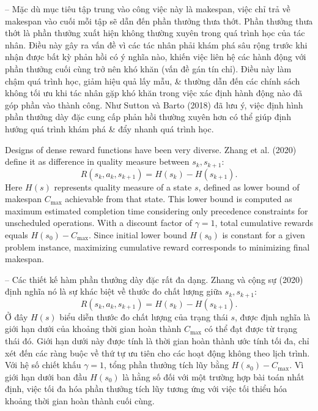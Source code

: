 \documentclass{article}
\begin{document}
\begin{itemize}
\begin{itemize}
        -- Mặc dù mục tiêu tập trung vào công việc này là makespan, việc chỉ trả về makespan vào cuối mỗi tập sẽ dẫn đến phần thưởng thưa thớt. Phần thưởng thưa thớt là phần thưởng xuất hiện không thường xuyên trong quá trình học của tác nhân. Điều này gây ra vấn đề vì các tác nhân phải khám phá sâu rộng trước khi nhận được bất kỳ phản hồi có ý nghĩa nào, khiến việc liên hệ các hành động với phần thưởng cuối cùng trở nên khó khăn (vấn đề gán tín chỉ). Điều này làm chậm quá trình học, giảm hiệu quả lấy mẫu, \& thường dẫn đến các chính sách không tối ưu khi tác nhân gặp khó khăn trong việc xác định hành động nào đã góp phần vào thành công. Như Sutton và Barto (2018) đã lưu ý, việc định hình phần thưởng dày đặc cung cấp phản hồi thường xuyên hơn có thể giúp định hướng quá trình khám phá \& đẩy nhanh quá trình học.

        Designs of dense reward functions have been very diverse. Zhang et al. (2020) define it as difference in quality measure between $s_k,s_{k+1}$:
        \begin{equation*}
            R(s_k,a_k,s_{k+1}) = H(s_k) - H(s_{k+1}).
        \end{equation*}
        Here $H(s)$ represents quality measure of a state $s$, defined as lower bound of makespan $C_{\max}$ achievable from that state. This lower bound is computed as maximum estimated completion time considering only precedence constraints for unscheduled operations. With a discount factor of $\gamma = 1$, total cumulative rewards equals $H(s_0) - C_{\max}$. Since initial lower bound $H(s_0)$ is constant for a given problem instance, maximizing cumulative reward corresponds to minimizing final makespan.

        -- Các thiết kế hàm phần thưởng dày đặc rất đa dạng. Zhang và cộng sự (2020) định nghĩa nó là sự khác biệt về thước đo chất lượng giữa $s_k,s_{k+1}$:
        \begin{equation*}
            R(s_k,a_k,s_{k+1}) = H(s_k) - H(s_{k+1}).
        \end{equation*}
        Ở đây $H(s)$ biểu diễn thước đo chất lượng của trạng thái $s$, được định nghĩa là giới hạn dưới của khoảng thời gian hoàn thành $C_{\max}$ có thể đạt được từ trạng thái đó. Giới hạn dưới này được tính là thời gian hoàn thành ước tính tối đa, chỉ xét đến các ràng buộc về thứ tự ưu tiên cho các hoạt động không theo lịch trình. Với hệ số chiết khấu $\gamma = 1$, tổng phần thưởng tích lũy bằng $H(s_0) - C_{\max}$. Vì giới hạn dưới ban đầu $H(s_0)$ là hằng số đối với một trường hợp bài toán nhất định, việc tối đa hóa phần thưởng tích lũy tương ứng với việc tối thiểu hóa khoảng thời gian hoàn thành cuối cùng.


\end{itemize}
\end{itemize}
\end{document}
